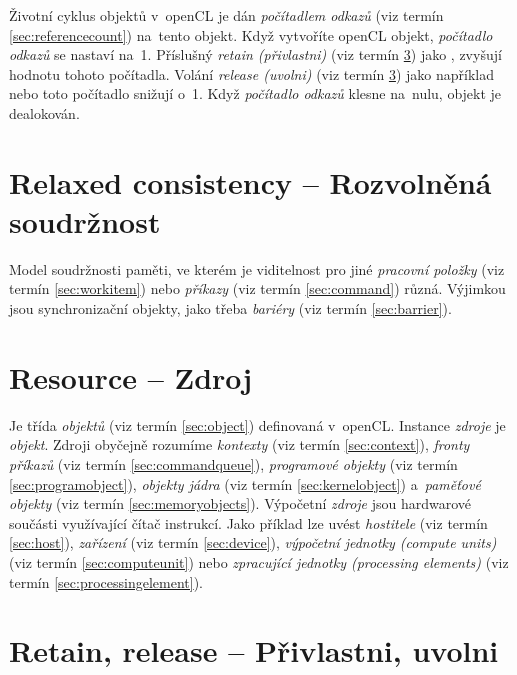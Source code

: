 Životní cyklus objektů v~openCL je dán \emph{počítadlem odkazů} (viz termín \ref{sec:referencecount}) na~tento objekt.
Když vytvoříte openCL objekt, \emph{počítadlo odkazů} se nastaví na~1. Příslušný
\emph{retain (přivlastni)} (viz termín \ref{sec:retainrelease}) jako ,  zvyšují hodnotu tohoto počítadla. Volání
\emph{release (uvolni)} (viz termín \ref{sec:retainrelease}) jako například  nebo 
 toto počítadlo snižují o~1. Když \emph{
počítadlo odkazů} klesne na~nulu, objekt je dealokován.

\section{Relaxed consistency -- Rozvolněná soudržnost}
\label{sec:relaxedconsistency}

Model soudržnosti paměti, ve kterém je viditelnost pro jiné \emph{pracovní položky} (viz termín \ref{sec:workitem})
nebo \emph{příkazy} (viz termín \ref{sec:command}) různá. Výjimkou jsou synchronizační objekty, jako třeba 
\emph{bariéry} (viz termín \ref{sec:barrier}).

\section{Resource -- Zdroj}
\label{sec:resource}

Je třída \emph{objektů} (viz termín \ref{sec:object}) definovaná v~openCL. Instance \emph{zdroje} je \emph{objekt}.
Zdroji obyčejně rozumíme \emph{kontexty} (viz termín \ref{sec:context}), \emph{fronty příkazů} (viz termín \ref{sec:commandqueue}), \emph{programové objekty} (viz termín \ref{sec:programobject}), \emph{objekty jádra} (viz termín \ref{sec:kernelobject}) a~\emph{paměťové objekty} (viz termín \ref{sec:memoryobjects}). Výpočetní \emph{zdroje}
jsou hardwarové součásti využívající čítač instrukcí. Jako příklad lze uvést
\emph{hostitele} (viz termín \ref{sec:host}), \emph{zařízení} (viz termín \ref{sec:device}), \emph{výpočetní jednotky (compute units)} (viz termín \ref{sec:computeunit}) nebo \emph{zpracující jednotky (processing elements)} (viz termín \ref{sec:processingelement}).

\section{Retain, release -- Přivlastni, uvolni}
\label{sec:retainrelease}

